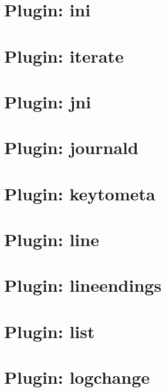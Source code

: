 \documentclass[twoside]{book}
\newcommand{\+}{\discretionary{\mbox{\scriptsize$\hookleftarrow$}}{}{}}
\begin{document}
\chapter{Plugin\+: ini}
\label{md_src_plugins_ini_README}
\hypertarget{md_src_plugins_ini_README}{}

\chapter{Plugin\+: iterate}
\label{md_src_plugins_iterate_README}
\hypertarget{md_src_plugins_iterate_README}{}

\chapter{Plugin\+: jni}
\label{md_src_plugins_jni_README}
\hypertarget{md_src_plugins_jni_README}{}

\chapter{Plugin\+: journald}
\label{md_src_plugins_journald_README}
\hypertarget{md_src_plugins_journald_README}{}

\chapter{Plugin\+: keytometa}
\label{md_src_plugins_keytometa_README}
\hypertarget{md_src_plugins_keytometa_README}{}

\chapter{Plugin\+: line}
\label{md_src_plugins_line_README}
\hypertarget{md_src_plugins_line_README}{}

\chapter{Plugin\+: lineendings}
\label{md_src_plugins_lineendings_README}
\hypertarget{md_src_plugins_lineendings_README}{}

\chapter{Plugin\+: list}
\label{md_src_plugins_list_README}
\hypertarget{md_src_plugins_list_README}{}

\chapter{Plugin\+: logchange}
\label{md_src_plugins_logchange_README}
\hypertarget{md_src_plugins_logchange_README}{}

\end{document}
